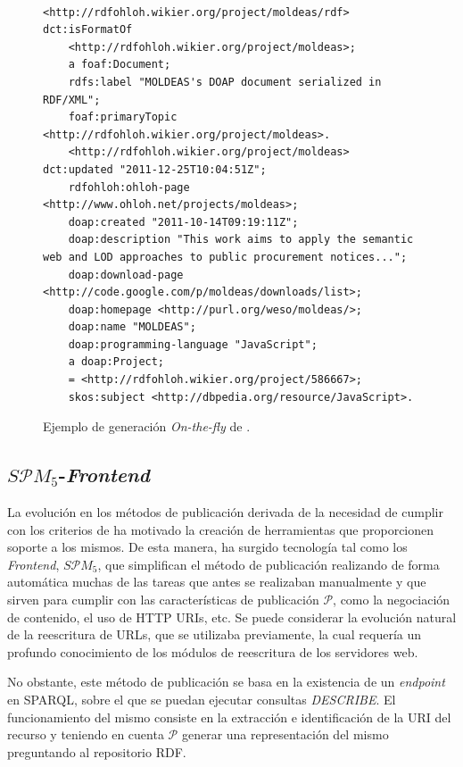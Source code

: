\begin{figure}[!htp]
\begin{lstlisting}

<http://rdfohloh.wikier.org/project/moldeas/rdf> dct:isFormatOf 
	<http://rdfohloh.wikier.org/project/moldeas>;
	a foaf:Document;
	rdfs:label "MOLDEAS's DOAP document serialized in RDF/XML";
	foaf:primaryTopic <http://rdfohloh.wikier.org/project/moldeas>.
	<http://rdfohloh.wikier.org/project/moldeas> dct:updated "2011-12-25T10:04:51Z";
	rdfohloh:ohloh-page <http://www.ohloh.net/projects/moldeas>;
	doap:created "2011-10-14T09:19:11Z";
	doap:description "This work aims to apply the semantic web and LOD approaches to public procurement notices...";
	doap:download-page <http://code.google.com/p/moldeas/downloads/list>;
	doap:homepage <http://purl.org/weso/moldeas/>;
	doap:name "MOLDEAS";
	doap:programming-language "JavaScript";
	a doap:Project;
	= <http://rdfohloh.wikier.org/project/586667>;
	skos:subject <http://dbpedia.org/resource/JavaScript>.

\end{lstlisting}
	\caption{Ejemplo de generación \textit{On-the-fly} de \linkeddata.}
	\label{fig:moldeas-ohloh}
\end{figure}

\subsection{$S\mathcal{P}M_{5}$-\linkeddata \textit{Frontend}}\label{linkeddata-frontend}
La evolución en los métodos de publicación derivada de la necesidad de cumplir
con los criterios de \linkeddata ha motivado la creación de herramientas
que proporcionen soporte a los mismos. De esta manera, ha surgido tecnología tal como
los \linkeddata \textit{Frontend}, $S\mathcal{P}M_{5}$, que simplifican el método de publicación
realizando de forma automática muchas de las tareas que antes se realizaban manualmente y que sirven para cumplir con las características de publicación $\mathcal{P}$, 
como la negociación de contenido, el uso de HTTP URIs, etc. Se puede considerar
la evolución natural de la reescritura de URLs, que se utilizaba previamente, la cual requería un profundo conocimiento 
de los módulos de reescritura de los servidores web.

No obstante, este método de publicación se basa en la existencia de un \textit{endpoint}
en \gls{SPARQL}, sobre el que se puedan ejecutar consultas \textit{DESCRIBE}. El funcionamiento del mismo 
consiste en la extracción e identificación de la \gls{URI} del recurso y teniendo en cuenta $\mathcal{P}$ generar 
una representación del mismo preguntando al repositorio \gls{RDF}. 

